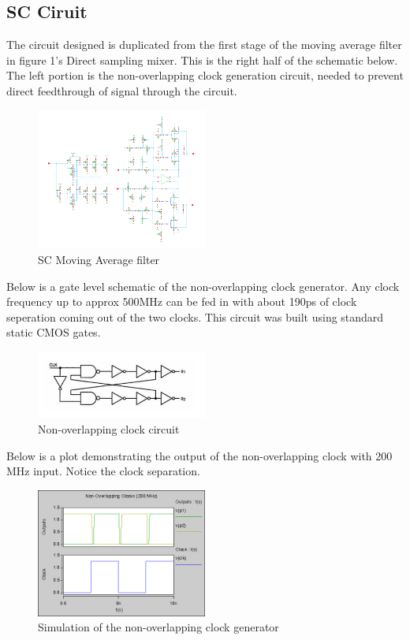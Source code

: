\documentclass[conference]{IEEEtran}
\begin{document}
\subsection{SC Ciruit}
The circuit designed is duplicated from the first stage of the moving average filter in figure 1's Direct sampling mixer. This is the right half of the schematic below. The left portion is the non-overlapping clock generation circuit, needed to prevent direct feedthrough of signal through the circuit.
\FloatBarrier
\begin{figure}[htb]
\centering
\includegraphics[width=0.5\textwidth]{sc_circuit.png}
\caption{SC Moving Average filter}
\label{folded}
\end{figure}
\FloatBarrier
Below is a gate level schematic of the non-overlapping clock generator. Any clock frequency up to approx 500MHz can be fed in with about 190ps of clock seperation coming out of the two clocks. This circuit was built using standard static CMOS gates.
\FloatBarrier
\begin{figure}[htb]
\centering
\includegraphics[width=0.5\textwidth]{xxx.png}
\caption{Non-overlapping clock circuit}
\label{folded}
\end{figure}
\FloatBarrier

Below is a plot demonstrating the output of the non-overlapping clock with 200 MHz input. Notice the clock separation.
\FloatBarrier
\begin{figure}[htb]
\centering
\includegraphics[width=0.5\textwidth]{non_overlap.png}
\caption{Simulation of the non-overlapping clock generator}
\label{folded}
\end{figure}
\FloatBarrier
\end{document}
